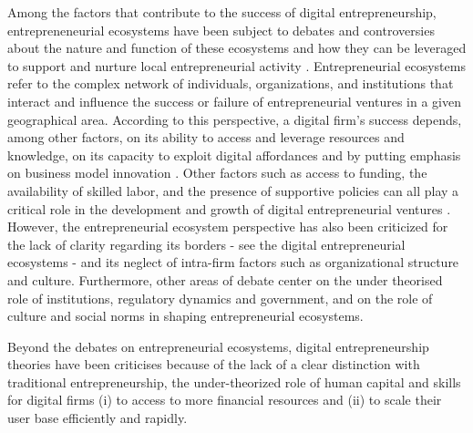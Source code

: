 \documentclass[12pt]{article}
\begin{document}
Among the factors that contribute to the success of digital entrepreneurship, entrepreneneurial ecosystems have been subject to debates and controversies about the nature and function of these ecosystems and how they can be leveraged to support and nurture local entrepreneurial activity \citep{spigel2017relational}. Entrepreneurial ecosystems refer to the complex network of individuals, organizations, and institutions that interact and influence the success or failure of entrepreneurial ventures in a given geographical area. According to this perspective, a digital firm's success depends, among other factors, on its ability to access and leverage resources and knowledge, on its capacity to exploit digital affordances and by putting emphasis on business model innovation \citep{autio2018digital, spigel2022examining}. Other factors such as access to funding, the availability of skilled labor, and the presence of supportive policies can all play a critical role in the development and growth of digital entrepreneurial ventures \citep{sussan2017digital}. However, the entrepreneurial ecosystem perspective has also been criticized for the lack of clarity regarding its borders \citep{sussan2017digital, song2019digital} - see the digital entrepreneurial ecosystems \citet{nachira2002towards} - and its neglect of intra-firm factors such as organizational structure and culture. Furthermore, other areas of debate center on the under theorised role of institutions, regulatory dynamics and government, and on the role of culture and social norms in shaping entrepreneurial ecosystems.

Beyond the debates on entrepreneurial ecosystems, digital entrepreneurship theories have been criticises because of the lack of a clear distinction with traditional entrepreneurship, the under-theorized role of human capital and skills for digital firms (i) to access to more financial resources and (ii) to scale their user base efficiently and rapidly.
\end{document}
